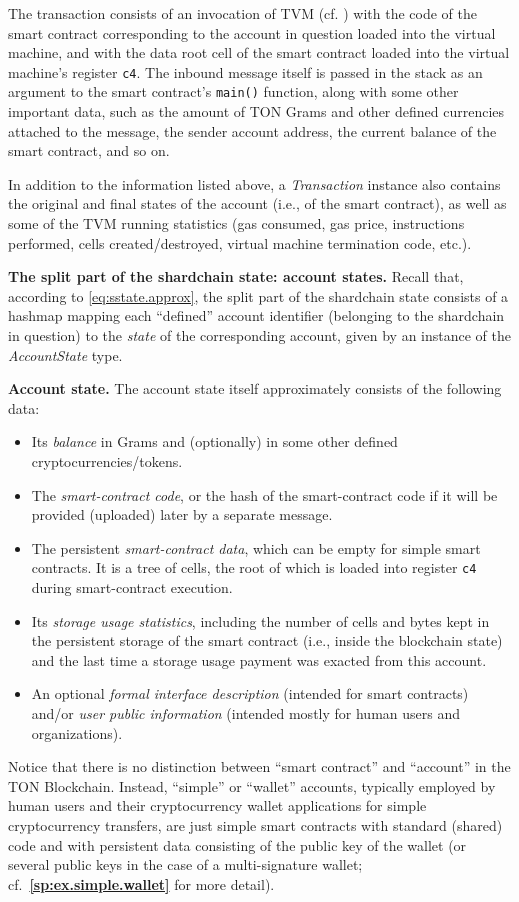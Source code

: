 \documentclass[12pt,oneside]{article}
\def\makepoint#1{\medbreak\noindent{\bf #1.\ }}
\def\nxsubpoint{\refstepcounter{subsubsection}%
  \smallbreak\makepoint{\thesubsubsection}}
\def\refpoint#1{{\rm\textbf{\ref{#1}}}}
\let\ptref=\refpoint
\def\emb#1{\textbf{#1.}}
\begin{document}
The transaction consists of an invocation of TVM (cf. \cite{TVM}) with the code of the smart contract corresponding to the account in question loaded into the virtual machine, and with the data root cell of the smart contract loaded into the virtual machine's register \texttt{c4}. The inbound message itself is passed in the stack as an argument to the smart contract's {\tt main()} function, along with some other important data, such as the amount of TON Grams and other defined currencies attached to the message, the sender account address, the current balance of the smart contract, and so on.

In addition to the information listed above, a {\em Transaction\/} instance also contains the original and final states of the account (i.e., of the smart contract), as well as some of the TVM running statistics (gas consumed, gas price, instructions performed, cells created/destroyed, virtual machine termination code, etc.).

\nxsubpoint\emb{The split part of the shardchain state: account states}
Recall that, according to \eqref{eq:sstate.approx}, the split part of the shardchain state consists of a hashmap mapping each ``defined'' account identifier (belonging to the shardchain in question) to the {\em state\/} of the corresponding account, given by an instance of the {\em AccountState\/} type.

\nxsubpoint\emb{Account state}
The account state itself approximately consists of the following data:
\begin{itemize}
\item Its {\em balance} in Grams and (optionally) in some other defined cryptocurrencies/tokens.
\item The {\em smart-contract code}, or the hash of the smart-contract code if it will be provided (uploaded) later by a separate message.
\item The persistent {\em smart-contract data}, which can be empty for simple smart contracts. It is a tree of cells, the root of which is loaded into register {\tt c4} during smart-contract execution.
\item Its {\em storage usage statistics}, including the number of cells and bytes kept in the persistent storage of the smart contract (i.e., inside the blockchain state) and the last time a storage usage payment was exacted from this account.
\item An optional {\em formal interface description} (intended for smart contracts) and/or {\em user public information} (intended mostly for human users and organizations).
\end{itemize}
Notice that there is no distinction between ``smart contract'' and ``account'' in the TON Blockchain. Instead, ``simple'' or ``wallet'' accounts, typically employed by human users and their cryptocurrency wallet applications for simple cryptocurrency transfers, are just simple smart contracts with standard (shared) code and with persistent data consisting of the public key of the wallet (or several public keys in the case of a multi-signature wallet; cf.~\ptref{sp:ex.simple.wallet} for more detail).
\end{document}
